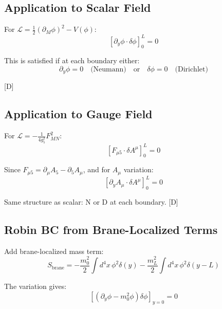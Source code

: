 \documentclass[11pt,a4paper]{article}
\newcommand{\tagD}{\textcolor{blue!70!black}{[D]}}
\begin{document}
\subsection{Application to Scalar Field}

For $\mathcal{L} = \frac{1}{2}(\partial_M \phi)^2 - V(\phi)$:
\begin{equation}
\label{eq:scalar-bdry}
\left[ \partial_y \phi \cdot \delta\phi \right]_0^L = 0
\end{equation}

This is satisfied if at each boundary either:
\begin{equation}
\label{eq:scalar-allowed}
\partial_y \phi = 0 \quad \text{(Neumann)} \quad \text{or} \quad \delta\phi = 0 \quad \text{(Dirichlet)}
\end{equation}

\tagD

\subsection{Application to Gauge Field}

For $\mathcal{L} = -\frac{1}{4g_5^2} F_{MN}^2$:
\begin{equation}
\label{eq:gauge-bdry}
\left[ F_{\mu 5} \cdot \delta A^\mu \right]_0^L = 0
\end{equation}

Since $F_{\mu 5} = \partial_\mu A_5 - \partial_5 A_\mu$, and for $A_\mu$ variation:
\begin{equation}
\label{eq:gauge-bdry-2}
\left[ \partial_y A_\mu \cdot \delta A^\mu \right]_0^L = 0
\end{equation}

Same structure as scalar: N or D at each boundary. \tagD

\subsection{Robin BC from Brane-Localized Terms}

Add brane-localized mass term:
\begin{equation}
\label{eq:brane-mass}
S_{\text{brane}} = -\frac{m_0^2}{2} \int d^4x \, \phi^2 \delta(y) - \frac{m_L^2}{2} \int d^4x \, \phi^2 \delta(y - L)
\end{equation}

The variation gives:
\begin{equation}
\label{eq:robin-variation}
\left[ (\partial_y \phi - m_0^2 \phi) \delta\phi \right]_{y=0} = 0
\end{equation}
\end{document}
